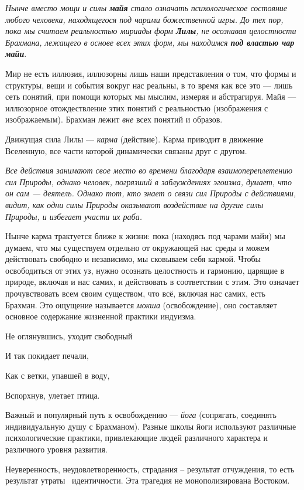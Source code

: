 \textit{Нынче вместо мощи и силы \textbf{майя} стало означать психологическое состояние любого человека, находящегося под чарами
божественной игры. До тех пор, пока мы считаем реальностью мириады форм \textbf{Лилы}, не осознавая целостности
Брахмана, лежащего в основе всех этих форм, мы находимся \textbf{под властью чар майи}}.

Мир не есть иллюзия, иллюзорны лишь наши представления о том, что формы и структуры, вещи и события вокруг нас реальны,
в то время как все это — лишь сеть понятий, при помощи которых мы мыслим, измеряя и абстрагируя. Майя — иллюзорное
отождествление этих понятий с реальностью (изображения с изображаемым). Брахман лежит \textit{вне} всех понятий и
образов.

Движущая сила Лилы — \textit{карма} (действие). Карма приводит в движение Вселенную, все части которой динамически
связаны друг с другом.

\textit{\flqq Все действия занимают свое место во времени благодаря взаимопереплетению сил Природы, однако человек, погрязший в
заблуждениях эгоизма, думает, что он сам — деятель. Однако тот, кто знает о связи сил Природы с действиями, видит, как
одни силы Природы оказывают воздействие на другие силы Природы, и избегает участи их раба\frqq.}

Нынче карма трактуется \flqq ближе к жизни\frqq: пока (находясь под чарами майи) мы думаем, что мы существуем отдельно от
окружающей нас среды и можем действовать свободно и независимо, мы сковываем себя кармой. Чтобы освободиться от этих
уз, нужно осознать целостность и гармонию, царящие в природе, включая и нас самих, и действовать в соответствии с этим.
Это означает прочувствовать всем своим существом, что всё, включая нас самих, есть Брахман. Это ощущение называется
\textit{мокша} (освобождение), оно составляет основное содержание жизненной практики индуизма.


Не оглянувшись, уходит свободный


И так покидает печали,


Как с ветки, упавшей в воду,


Вспорхнув, улетает птица.

Важный и популярный путь к освобождению — \textit{йога} (сопрягать, соединять индивидуальную душу с Брахманом). Разные
школы йоги используют различные психологические практики, привлекающие людей различного характера и различного уровня
развития.


Неуверенность, неудовлетворенность, страдания – результат отчуждения, то есть результат утраты \ идентичности. Эта
трагедия не монополизирована Востоком.

